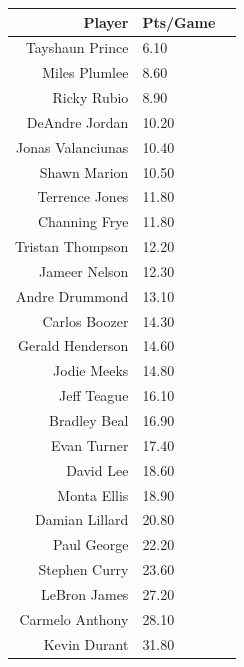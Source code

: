 \documentclass[letterpaper]{exam}
\begin{document}
\begin{questions}
      \begin{table}[ht]
        \centering
        \begin{tabular}{rlr}
          \toprule
          Player            & Pts/Game \\
          \midrule
          Tayshaun Prince   & 6.10 \\
          Miles Plumlee     & 8.60 \\
          Ricky Rubio       & 8.90 \\
          DeAndre Jordan    & 10.20 \\
          Jonas Valanciunas & 10.40 \\
          Shawn Marion      & 10.50 \\
          Terrence Jones    & 11.80 \\
          Channing Frye     & 11.80 \\
          Tristan Thompson  & 12.20 \\
          Jameer Nelson     & 12.30 \\
          Andre Drummond    & 13.10 \\
          Carlos Boozer     & 14.30 \\
          Gerald Henderson  & 14.60 \\
          Jodie Meeks       & 14.80 \\
          Jeff Teague       & 16.10 \\
          Bradley Beal      & 16.90 \\
          Evan Turner       & 17.40 \\
          David Lee         & 18.60 \\
          Monta Ellis       & 18.90 \\
          Damian Lillard    & 20.80 \\
          Paul George       & 22.20 \\
          Stephen Curry     & 23.60 \\
          LeBron James      & 27.20 \\
          Carmelo Anthony   & 28.10 \\
          Kevin Durant      & 31.80 \\
          \bottomrule
        \end{tabular}
      \end{table}

\end{questions}
\end{document}
